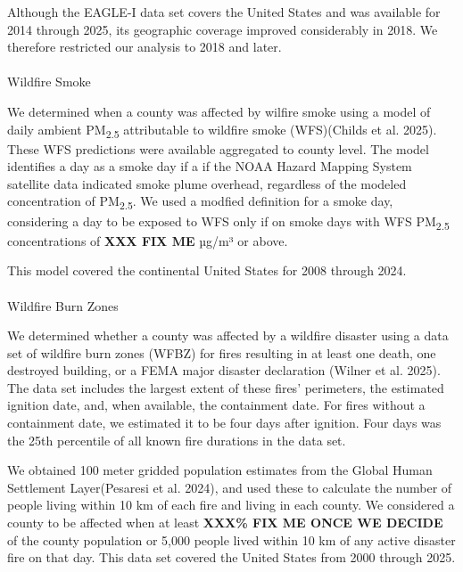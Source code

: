 \documentclass[
  letterpaper,
  DIV=11,
  numbers=noendperiod]{scrartcl}
\makeatletter
\let\oldparagraph\paragraph
\renewcommand{\paragraph}{
    \@ifstar
      \xxxParagraphStar
      \xxxParagraphNoStar
  }
\newcommand{\xxxParagraphStar}[1]{\oldparagraph*{#1}\mbox{}}
\newcommand{\xxxParagraphNoStar}[1]{\oldparagraph{#1}\mbox{}}
\makeatother
\begin{document}
Although the EAGLE-I data set covers the United States and was available
for 2014 through 2025, its geographic coverage improved considerably in
2018. We therefore restricted our analysis to 2018 and later.

\paragraph{Wildfire Smoke}\label{wildfire-smoke}

We determined when a county was affected by wilfire smoke using a model
of daily ambient PM\textsubscript{2.5} attributable to wildfire smoke
(WFS)(Childs et al. 2025). These WFS predictions were available
aggregated to county level. The model identifies a day as a smoke day if
a if the NOAA Hazard Mapping System satellite data indicated smoke plume
overhead, regardless of the modeled concentration of
PM\textsubscript{2.5}. We used a modfied definition for a smoke day,
considering a day to be exposed to WFS only if on smoke days with WFS
PM\textsubscript{2.5} concentrations of \textbf{XXX FIX ME} µg/m³ or
above.

This model covered the continental United States for 2008 through 2024.

\paragraph{Wildfire Burn Zones}\label{wildfire-burn-zones}

We determined whether a county was affected by a wildfire disaster using
a data set of wildfire burn zones (WFBZ) for fires resulting in at least
one death, one destroyed building, or a FEMA major disaster declaration
(Wilner et al. 2025). The data set includes the largest extent of these
fires' perimeters, the estimated ignition date, and, when available, the
containment date. For fires without a containment date, we estimated it
to be four days after ignition. Four days was the 25th percentile of all
known fire durations in the data set.

We obtained 100 meter gridded population estimates from the Global Human
Settlement Layer(Pesaresi et al. 2024), and used these to calculate the
number of people living within 10 km of each fire and living in each
county. We considered a county to be affected when at least
\textbf{XXX\% FIX ME ONCE WE DECIDE} of the county population or 5,000
people lived within 10 km of any active disaster fire on that day. This
data set covered the United States from 2000 through 2025.
\end{document}
